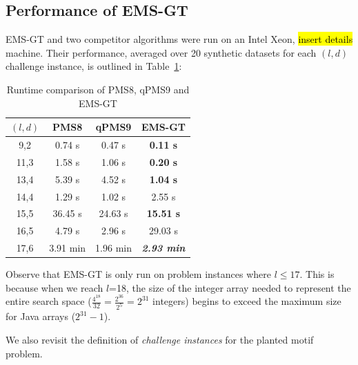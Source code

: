 \documentclass[conference]{IEEEtran}
\begin{document}
	\newpage
	\subsection{Performance of EMS-GT}
		EMS-GT and two competitor algorithms were run on an Intel Xeon, \hl{insert details} machine. Their performance, averaged over 20 synthetic datasets for each $(l,d)$ challenge instance, is outlined in Table~\ref{tbl:runtimes_v_pms}:

		\begin{table}[ht] %
			\renewcommand{\arraystretch}{1.3}
			\caption{Runtime comparison of PMS8, qPMS9 and EMS-GT}
			\label{tbl:runtimes_v_pms}
			\centering
			\begin{tabular}{|c|c|c|c|}
			\hline \bfseries\boldmath $(l,d)$ & \bfseries PMS8 & \bfseries qPMS9 & \bfseries EMS-GT\\
			\hline
			 9,2 &  0.74 s  &  0.47 s & {\bf 0.11 s}\\
			11,3 &  1.58 s  &  1.06 s & {\bf 0.20 s}\\
			13,4 &  5.39 s  &  4.52 s & {\bf 1.04 s}\\
			14,4 &  1.29 s  &  1.02 s &      2.55 s\\
			15,5 & 36.45 s  & 24.63 s & {\bf15.51 s}\\
			16,5 &  4.79 s  &  2.96 s &     29.03 s\\
			17,6 &  3.91 min & 1.96 min & \textbf{\emph{2.93 min}}\\
			\hline\end{tabular}
			\end{table}

		Observe that EMS-GT is only run on problem instances where $l \leq 17$. This is because when we reach $l$=18, the size of the integer array needed to represent the entire search space ($\frac{4^{18}}{32} = \frac{2^{36}}{2^{5}} = 2^{31}$ integers) begins to exceed the maximum size for Java arrays ($2^{31} - 1$).

		We also revisit the definition of \emph{challenge instances} for the planted motif problem. 

\end{document}
